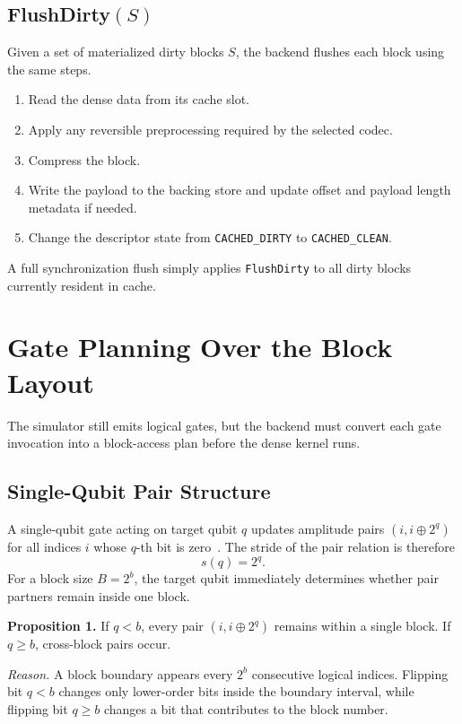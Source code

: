 \documentclass[runningheads]{llncs}
\begin{document}
\subsection{FlushDirty$(S)$}

Given a set of materialized dirty blocks $S$, the backend flushes each block using the same steps.
\begin{enumerate}[leftmargin=1.5em]
  \item Read the dense data from its cache slot.
  \item Apply any reversible preprocessing required by the selected codec.
  \item Compress the block.
  \item Write the payload to the backing store and update offset and payload length metadata if needed.
  \item Change the descriptor state from \texttt{CACHED\_DIRTY} to \texttt{CACHED\_CLEAN}.
\end{enumerate}

A full synchronization flush simply applies \texttt{FlushDirty} to all dirty blocks currently resident in cache.

\section{Gate Planning Over the Block Layout}

The simulator still emits logical gates, but the backend must convert each gate invocation into a block-access plan before the dense kernel runs.

\subsection{Single-Qubit Pair Structure}

A single-qubit gate acting on target qubit $q$ updates amplitude pairs $(i, i \oplus 2^q)$ for all indices $i$ whose $q$-th bit is zero~\cite{Nielsen2010}. The stride of the pair relation is therefore
\begin{equation}
  s(q)=2^q.
\end{equation}
For a block size $B=2^b$, the target qubit immediately determines whether pair partners remain inside one block.

\textbf{Proposition 1.} If $q<b$, every pair $(i,i\oplus 2^q)$ remains within a single block. If $q\geq b$, cross-block pairs occur.

\textit{Reason.} A block boundary appears every $2^b$ consecutive logical indices. Flipping bit $q<b$ changes only lower-order bits inside the boundary interval, while flipping bit $q\geq b$ changes a bit that contributes to the block number.
\end{document}
